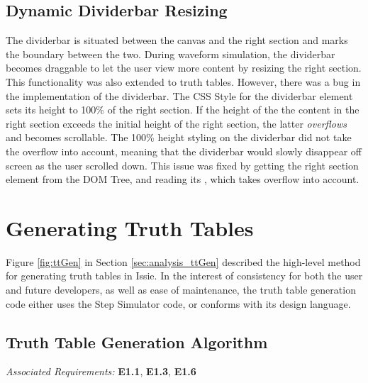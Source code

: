 \subsection{Dynamic Dividerbar Resizing}
The dividerbar is situated between the canvas and the right section and marks the boundary between the two. During waveform simulation, the dividerbar becomes draggable to let the user view more content by resizing the right section. This functionality was also extended to truth tables. However, there was a bug in the implementation of the dividerbar. The CSS Style for the dividerbar element sets its height to 100\% of the right section. If the height of the the content in the right section exceeds the initial height of the right section, the latter \textit{overflows} and becomes scrollable. The 100\% height styling on the dividerbar did not take the overflow into account, meaning that the dividerbar would slowly disappear off screen as the user scrolled down. This issue was fixed by getting the right section  element from the DOM Tree, and reading its , which takes overflow into account. 

\section{Generating Truth Tables}
Figure \ref{fig:ttGen} in Section \ref{sec:analysis_ttGen} described the high-level method for generating truth tables in Issie. In the interest of consistency for both the user and future developers, as well as ease of maintenance, the truth table generation code either uses the Step Simulator code, or conforms with its design language.







\subsection{Truth Table Generation Algorithm}
\emph{Associated Requirements:} \textbf{E1.1}, \textbf{E1.3}, \textbf{E1.6}


